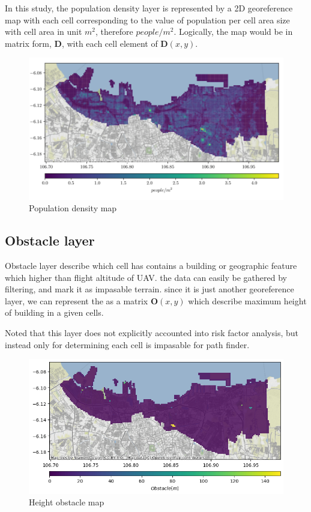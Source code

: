 \documentclass[12pt]{report}
\begin{document}
            In this study, the population density layer is represented by a 2D georeference map with each cell
            corresponding to the value of population per cell area size with cell area in unit \(m^2\), therefore
            \(people/m^2\). Logically, the map would be in matrix form, \textbf{D}, with each cell element of
            \(\mathbf{D}(x, y)\).

            \begin{figure}[H]
                \centering
                \includegraphics[width=\textwidth]{Plot/pop_dense.PNG}
                \caption{Population density map}
            \end{figure}

        \subsection{Obstacle layer}
            Obstacle layer describe which cell has contains a building or geographic feature which higher than flight
            altitude of UAV. the data can easily be gathered by filtering, and mark it as impasable terrain. since it is
            just another georeference layer, we can represent the as a matrix \(\mathbf{O}(x, y)\) which describe maximum height of
            building in a given cells.

            Noted that this layer does not explicitly accounted into risk factor analysis, but instead only for
            determining each cell is impasable for path finder.
            \begin{figure}[H]
                \centering
                \includegraphics[width=\textwidth]{Plot/obstacle.png}
                \caption{Height obstacle map}
            \end{figure}
\end{document}
